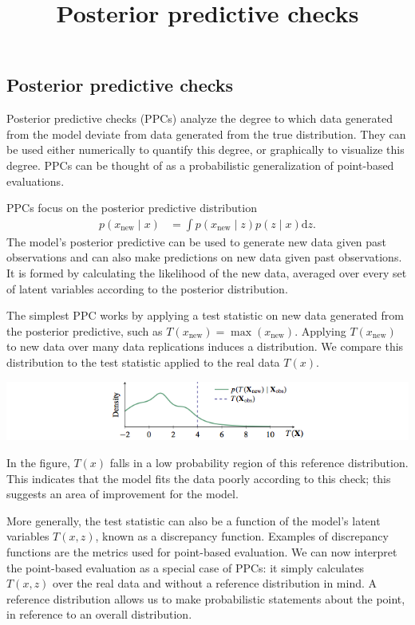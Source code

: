 \title{Posterior predictive checks}

\subsection{Posterior predictive checks}

Posterior predictive checks (PPCs)
analyze the degree to which data generated from the model deviate from
data generated from the true distribution. They can be used either
numerically to quantify this degree, or graphically to visualize this
degree. PPCs can be thought of as a probabilistic generalization of
point-based evaluations.

PPCs focus on the posterior predictive distribution
\begin{align*}
  p(x_\text{new} \mid x)
  &=
  \int
  p(x_\text{new} \mid z)
  p(z \mid x)
  \text{d} z.
\end{align*}
The model's posterior predictive can be used to generate new data
given past observations and can also make predictions on new data
given past observations.
It is formed by calculating the likelihood of the new data, averaged
over every set of latent variables according to the posterior
distribution.

The simplest PPC works by applying a test statistic on new data
generated from the posterior predictive, such as
$T(x_\text{new}) = \max(x_\text{new})$.  Applying $T(x_\text{new})$ to
new data over many data replications induces a distribution. We compare
this distribution to the test statistic applied to the real data $T(x)$.

\includegraphics{images/ppc.png}

In the figure, $T(x)$ falls in a low probability region of this
reference distribution. This indicates that the model fits the data
poorly according to this check; this suggests an area of improvement
for the model.

More generally, the test statistic can also be a function of the
model's latent variables $T(x, z)$, known as a discrepancy function.
Examples of discrepancy functions are the metrics used for point-based
evaluation. We can now interpret the point-based evaluation as a
special case of PPCs: it simply calculates $T(x, z)$ over the real
data and without a reference distribution in mind. A reference
distribution allows us to make probabilistic statements about the
point, in reference to an overall distribution.

